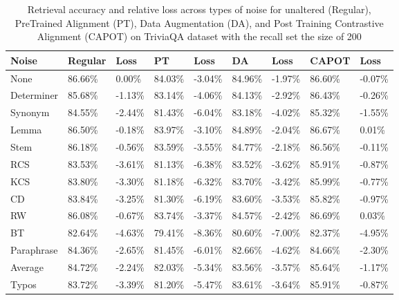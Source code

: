 \begin{table*}[!ht]
    \centering
    \begin{tabular}{|l|l|l|l|l|l|l|l|l|}
    \hline
        Noise & Regular & Loss & PT & Loss & DA & Loss & CAPOT & Loss \\ \hline
        None & 86.66\% & 0.00\% & 84.03\% & -3.04\% & 84.96\% & -1.97\% & 86.60\% & -0.07\% \\ \hline
        Determiner & 85.68\% & -1.13\% & 83.14\% & -4.06\% & 84.13\% & -2.92\% & 86.43\% & -0.26\% \\ \hline
        Synonym & 84.55\% & -2.44\% & 81.43\% & -6.04\% & 83.18\% & -4.02\% & 85.32\% & -1.55\% \\ \hline
        Lemma & 86.50\% & -0.18\% & 83.97\% & -3.10\% & 84.89\% & -2.04\% & 86.67\% & 0.01\% \\ \hline
        Stem & 86.18\% & -0.56\% & 83.59\% & -3.55\% & 84.77\% & -2.18\% & 86.56\% & -0.11\% \\ \hline
        RCS & 83.53\% & -3.61\% & 81.13\% & -6.38\% & 83.52\% & -3.62\% & 85.91\% & -0.87\% \\ \hline
        KCS & 83.80\% & -3.30\% & 81.18\% & -6.32\% & 83.70\% & -3.42\% & 85.99\% & -0.77\% \\ \hline
        CD & 83.84\% & -3.25\% & 81.30\% & -6.19\% & 83.60\% & -3.53\% & 85.82\% & -0.97\% \\ \hline
        RW & 86.08\% & -0.67\% & 83.74\% & -3.37\% & 84.57\% & -2.42\% & 86.69\% & 0.03\% \\ \hline
        BT & 82.64\% & -4.63\% & 79.41\% & -8.36\% & 80.60\% & -7.00\% & 82.37\% & -4.95\% \\ \hline
        Paraphrase & 84.36\% & -2.65\% & 81.45\% & -6.01\% & 82.66\% & -4.62\% & 84.66\% & -2.30\% \\ \hline
        Average & 84.72\% & -2.24\% & 82.03\% & -5.34\% & 83.56\% & -3.57\% & 85.64\% & -1.17\% \\ \hline
        Typos & 83.72\% & -3.39\% & 81.20\% & -5.47\% & 83.61\% & -3.64\% & 85.91\% & -0.87\% \\ \hline
    \end{tabular}
    \caption{Retrieval accuracy and relative loss across types of noise for unaltered (Regular), PreTrained Alignment (PT),  Data Augmentation (DA), and Post Training Contrastive Alignment (CAPOT) on TriviaQA dataset with the recall set the size of 200}
    \label{tab:capot-trivia-200}
\end{table*}
